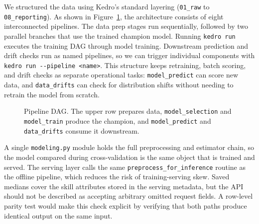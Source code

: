 \documentclass[11pt,a4paper]{article}
\newcommand{\code}[1]{\texttt{\small #1}}
\begin{document}
We structured the data using Kedro's standard layering (\code{01\_raw} to \code{08\_reporting}). As shown in Figure~\ref{fig:dag}, the architecture consists of eight interconnected pipelines. The data prep stages run sequentially, followed by two parallel branches that use the trained champion model. Running \code{kedro run} executes the training DAG through model training. Downstream prediction and drift checks run as named pipelines, so we can trigger individual components with \code{kedro run -{}-pipeline <name>}. This structure keeps retraining, batch scoring, and drift checks as separate operational tasks: \code{model\_predict} can score new data, and \code{data\_drifts} can check for distribution shifts without needing to retrain the model from scratch.

\begin{figure}[H]
\centering
{}
\caption{Pipeline DAG. The upper row prepares data, \code{model\_selection} and \code{model\_train}
produce the champion, and \code{model\_predict} and \code{data\_drifts} consume it downstream.}
\label{fig:dag}
\end{figure}

A single \code{modeling.py} module holds the full preprocessing and estimator chain, so the model
compared during cross-validation is the same object that is trained and served. The serving layer
calls the same \code{preprocess\_for\_inference} routine as the offline pipeline, which reduces
the risk of training-serving skew. Saved medians cover the skill attributes stored in the serving
metadata, but the API should not be described as accepting arbitrary omitted request fields. A row-level parity test would make this check explicit by
verifying that both paths produce identical output on the same input.
\end{document}
